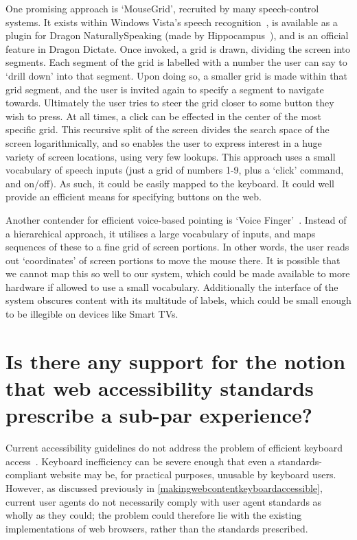 \documentclass[11pt,openright,a4paper]{report}
\begin{document}
One promising approach is `MouseGrid', recruited by many speech-control systems. It exists within Windows Vista's speech recognition~\cite{vistamousegrid}, is available as a plugin for Dragon NaturallySpeaking (made by Hippocampus~\cite{hippogrid}), and is an official feature in Dragon Dictate\cite{nuancegrid}. Once invoked, a grid is drawn, dividing the screen into segments. Each segment of the grid is labelled with a number the user can say to `drill down' into that segment. Upon doing so, a smaller grid is made within that grid segment, and the user is invited again to specify a segment to navigate towards. Ultimately the user tries to steer the grid closer to some button they wish to press.
At all times, a click can be effected in the center of the most specific grid. This recursive split of the screen divides the search space of the screen logarithmically, and so enables the user to express interest in a huge variety of screen locations, using very few lookups.
This approach uses a small vocabulary of speech inputs (just a grid of numbers 1-9, plus a `click' command, and on/off). As such, it could be easily mapped to the keyboard. It could well provide an efficient means for specifying buttons on the web.

Another contender for efficient voice-based pointing is `Voice Finger'~\cite{voicefinger}. Instead of a hierarchical approach, it utilises a large vocabulary of inputs, and maps sequences of these to a fine grid of screen portions. In other words, the user reads out `coordinates' of screen portions to move the mouse there. It is possible that we cannot map this so well to our system, which could be made available to more hardware if allowed to use a small vocabulary. Additionally the interface of the system obscures content with its multitude of labels, which could be small enough to be illegible on devices like Smart TVs.
\section{Is there any support for the notion that web accessibility standards prescribe a sub-par experience?}
\label{subparstandards}
Current accessibility guidelines do not address the problem of efficient keyboard access~\cite{schrepp2006efficiency}. Keyboard inefficiency can be severe enough that even a standards-compliant website may be, for practical purposes, unusable by keyboard users\cite{schrepp2006efficiency,coyne2001beyond,powlik2002accessibility}. However, as discussed previously in \cref{makingwebcontentkeyboardaccessible}, current user agents do not necessarily comply with user agent standards as wholly as they could; the problem could therefore lie with the existing implementations of web browsers, rather than the standards prescribed.
\end{document}
